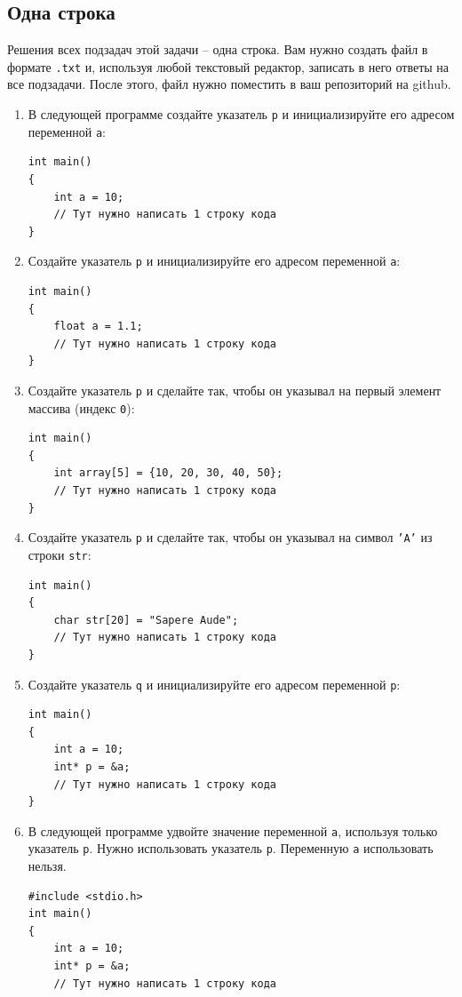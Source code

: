 \documentclass{article}
\begin{document}
\subsection{Одна строка}
Решения всех подзадач этой задачи -- одна строка. Вам нужно создать файл в формате \texttt{.txt} и, используя любой текстовый редактор, записать в него ответы на все подзадачи. После этого, файл нужно поместить в ваш репозиторий на github.

\begin{enumerate}
\item В следующей программе создайте указатель \texttt{p} и инициализируйте его адресом переменной \texttt{a}:
\begin{lstlisting}
int main() 
{
    int a = 10;
    // Тут нужно написать 1 строку кода
}
\end{lstlisting}

\item Создайте указатель \texttt{p} и инициализируйте его адресом переменной \texttt{a}:
\begin{lstlisting}
int main() 
{
    float a = 1.1;
    // Тут нужно написать 1 строку кода
}
\end{lstlisting}


\item Создайте указатель \texttt{p} и сделайте так, чтобы он указывал на первый элемент массива (индекс \texttt{0}):
\begin{lstlisting}
int main() 
{
    int array[5] = {10, 20, 30, 40, 50};
    // Тут нужно написать 1 строку кода
}
\end{lstlisting}


\item Создайте указатель \texttt{p} и сделайте так, чтобы он указывал на символ \texttt{'A'}  из строки \texttt{str}:
\begin{lstlisting}
int main() 
{
    char str[20] = "Sapere Aude";
    // Тут нужно написать 1 строку кода
}
\end{lstlisting}

\item Создайте указатель \texttt{q} и инициализируйте его адресом переменной \texttt{p}:
\begin{lstlisting}
int main() 
{
    int a = 10;
    int* p = &a;
    // Тут нужно написать 1 строку кода
}
\end{lstlisting}

\newpage
\item В следующей программе удвойте значение переменной \texttt{a}, используя только указатель \texttt{p}. Нужно использовать указатель \texttt{p}. Переменную \texttt{a} использовать нельзя.
\begin{multicols}{2}\noindent
\begin{lstlisting}
#include <stdio.h>
int main() 
{
    int a = 10;
    int* p = &a;
    // Тут нужно написать 1 строку кода
    

\end{lstlisting}
\end{multicols}
\end{enumerate}
\end{document}
